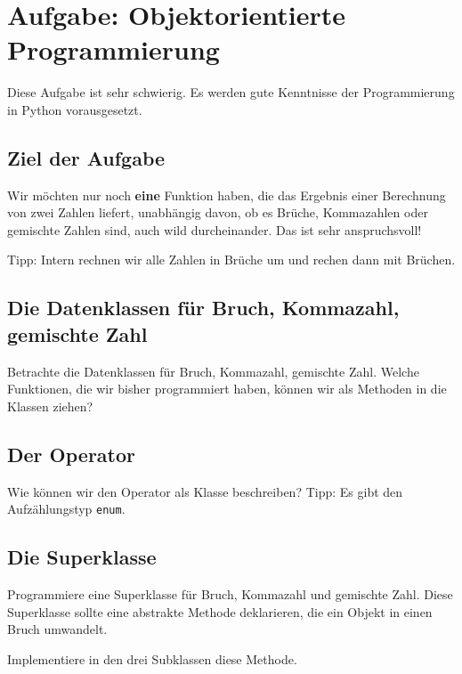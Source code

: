 \section{Aufgabe: Objektorientierte Programmierung}

Diese Aufgabe ist sehr schwierig. Es werden gute Kenntnisse der Programmierung in Python vorausgesetzt.

\subsection{Ziel der Aufgabe}

Wir möchten nur noch \textbf{eine} Funktion haben, die das Ergebnis einer Berechnung von zwei Zahlen liefert, unabhängig davon, ob es Brüche, Kommazahlen oder gemischte Zahlen sind, auch wild durcheinander. Das ist sehr anspruchsvoll!

Tipp: Intern rechnen wir alle Zahlen in Brüche um und rechen dann mit Brüchen.

\subsection{Die Datenklassen für Bruch, Kommazahl, gemischte Zahl}

Betrachte die Datenklassen für Bruch, Kommazahl, gemischte Zahl. Welche Funktionen, die wir bisher programmiert haben, können wir als Methoden in die Klassen ziehen?

\subsection{Der Operator}

Wie können wir den Operator als Klasse beschreiben? Tipp: Es gibt den Aufzählungstyp \texttt{enum}.

\subsection{Die Superklasse}

Programmiere eine Superklasse für Bruch, Kommazahl und gemischte Zahl. Diese Superklasse sollte eine abstrakte Methode deklarieren, die ein Objekt in einen Bruch umwandelt.

Implementiere in den drei Subklassen diese Methode.